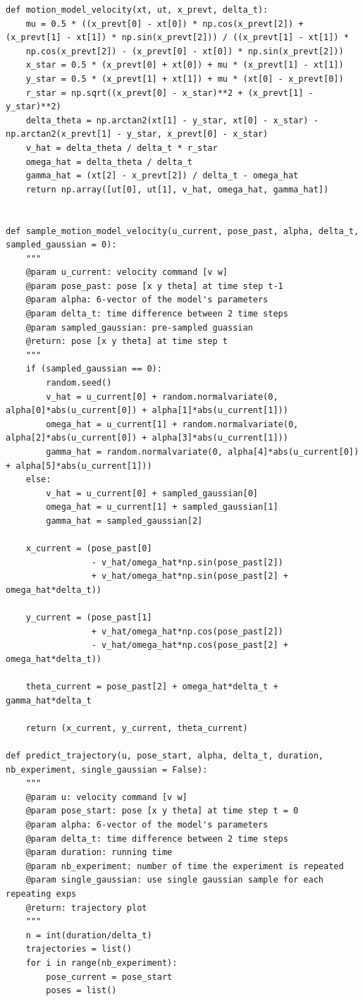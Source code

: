 \documentclass[a4paper, 12pt]{article}
\begin{document}
\begin{lstlisting}
def motion_model_velocity(xt, ut, x_prevt, delta_t):
    mu = 0.5 * ((x_prevt[0] - xt[0]) * np.cos(x_prevt[2]) + (x_prevt[1] - xt[1]) * np.sin(x_prevt[2])) / ((x_prevt[1] - xt[1]) *
    np.cos(x_prevt[2]) - (x_prevt[0] - xt[0]) * np.sin(x_prevt[2]))
    x_star = 0.5 * (x_prevt[0] + xt[0]) + mu * (x_prevt[1] - xt[1])
    y_star = 0.5 * (x_prevt[1] + xt[1]) + mu * (xt[0] - x_prevt[0])
    r_star = np.sqrt((x_prevt[0] - x_star)**2 + (x_prevt[1] - y_star)**2)
    delta_theta = np.arctan2(xt[1] - y_star, xt[0] - x_star) - np.arctan2(x_prevt[1] - y_star, x_prevt[0] - x_star)
    v_hat = delta_theta / delta_t * r_star
    omega_hat = delta_theta / delta_t
    gamma_hat = (xt[2] - x_prevt[2]) / delta_t - omega_hat
    return np.array([ut[0], ut[1], v_hat, omega_hat, gamma_hat])


def sample_motion_model_velocity(u_current, pose_past, alpha, delta_t, sampled_gaussian = 0):
    """
    @param u_current: velocity command [v w]
    @param pose_past: pose [x y theta] at time step t-1
    @param alpha: 6-vector of the model's parameters
    @param delta_t: time difference between 2 time steps
    @param sampled_gaussian: pre-sampled guassian
    @return: pose [x y theta] at time step t
    """
    if (sampled_gaussian == 0):
        random.seed()
        v_hat = u_current[0] + random.normalvariate(0, alpha[0]*abs(u_current[0]) + alpha[1]*abs(u_current[1]))
        omega_hat = u_current[1] + random.normalvariate(0, alpha[2]*abs(u_current[0]) + alpha[3]*abs(u_current[1]))
        gamma_hat = random.normalvariate(0, alpha[4]*abs(u_current[0]) + alpha[5]*abs(u_current[1]))
    else:
        v_hat = u_current[0] + sampled_gaussian[0]
        omega_hat = u_current[1] + sampled_gaussian[1]
        gamma_hat = sampled_gaussian[2]

    x_current = (pose_past[0]
                 - v_hat/omega_hat*np.sin(pose_past[2])
                 + v_hat/omega_hat*np.sin(pose_past[2] + omega_hat*delta_t))

    y_current = (pose_past[1]
                 + v_hat/omega_hat*np.cos(pose_past[2])
                 - v_hat/omega_hat*np.cos(pose_past[2] + omega_hat*delta_t))

    theta_current = pose_past[2] + omega_hat*delta_t + gamma_hat*delta_t

    return (x_current, y_current, theta_current)

def predict_trajectory(u, pose_start, alpha, delta_t, duration, nb_experiment, single_gaussian = False):
    """
    @param u: velocity command [v w]
    @param pose_start: pose [x y theta] at time step t = 0
    @param alpha: 6-vector of the model's parameters
    @param delta_t: time difference between 2 time steps
    @param duration: running time
    @param nb_experiment: number of time the experiment is repeated
    @param single_gaussian: use single gaussian sample for each repeating exps
    @return: trajectory plot
    """
    n = int(duration/delta_t)
    trajectories = list()
    for i in range(nb_experiment):
        pose_current = pose_start
        poses = list()
        

\end{lstlisting}
\end{document}
